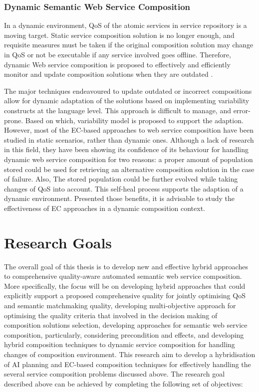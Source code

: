 \subsubsection{Dynamic Semantic Web Service Composition}
In a  dynamic environment, QoS of the atomic services in service repository is a moving target. Static service composition solution is no longer enough, and requisite measures must be taken if the original composition solution may change in QoS or not be executable if any service involved goes offline. Therefore, dynamic Web service composition is proposed to effectively and efficiently monitor and update composition solutions when they are outdated \cite{li2014fault}. 


The major techniques endeavoured to update outdated or incorrect compositions allow for dynamic adaptation of the solutions based on implementing variability constructs at the language level. This approach is difficult to manage, and error-prone.  Based on which, variability model \cite{alferez2014dynamic} is proposed to support the adaption. However, most of the EC-based approaches to web service composition have been studied in static scenarios, rather than dynamic ones. Although a lack of research in this field, they have been showing its confidence of its behaviour for handling dynamic web service composition for two reasons: a proper amount of population stored could be used for retrieving an alternative composition solution in the case of failure. Also, The stored population could be further evolved while taking changes of QoS into account. This self-heal process supports the adaption of a dynamic environment. Presented those benefits, it is advisable to study the effectiveness of EC approaches in a dynamic composition context.

 
\section{Research Goals}
The overall goal of this thesis is to develop new and effective hybrid approaches to comprehensive quality-aware automated semantic web service composition. More specifically, the focus will be on developing hybrid approaches that could explicitly support a proposed comprehensive quality for jointly optimising QoS and semantic matchmaking quality, developing multi-objective approach for optimising the quality criteria that involved in the decision making of composition solutions selection, developing approaches for semantic web service composition, particularly, considering precondition and effects, and developing hybrid composition techniques to dynamic service composition for handling changes of composition environment. This research aim to develop a hybridisation of AI planning and EC-based composition techniques for effectively handling the several service composition problems discussed above. The research goal described above can be achieved by completing the following set of objectives:



